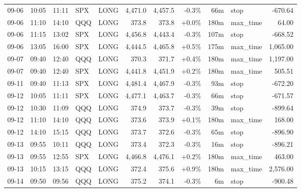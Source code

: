 \documentclass[11pt,a4paper,twoside]{article}
\begin{document}
\begin{center}
\begin{longtable}{>{\color{txtmain}}l l l l l r r r r >{\color{txtmain}}l r}
09-06 & 10:05 & 11:11 & SPX & LONG & 4,471.0 & 4,457.5 & \textcolor{lossred}{-0.3\%} & 66m & stop & \textcolor{lossred}{-670.64} \\
09-06 & 11:10 & 14:10 & QQQ & LONG & 373.8 & 373.8 & \textcolor{wingreen}{+0.0\%} & 180m & max\_time & \textcolor{wingreen}{64.00} \\
09-06 & 11:15 & 13:02 & SPX & LONG & 4,456.8 & 4,443.4 & \textcolor{lossred}{-0.3\%} & 107m & stop & \textcolor{lossred}{-668.52} \\
09-06 & 13:05 & 16:00 & SPX & LONG & 4,444.5 & 4,465.8 & \textcolor{wingreen}{+0.5\%} & 175m & max\_time & \textcolor{wingreen}{1,065.00} \\
09-07 & 09:40 & 12:40 & QQQ & LONG & 370.3 & 371.7 & \textcolor{wingreen}{+0.4\%} & 180m & max\_time & \textcolor{wingreen}{1,197.00} \\
09-07 & 09:40 & 12:40 & SPX & LONG & 4,441.8 & 4,451.9 & \textcolor{wingreen}{+0.2\%} & 180m & max\_time & \textcolor{wingreen}{505.51} \\
09-11 & 09:40 & 11:13 & SPX & LONG & 4,481.4 & 4,467.9 & \textcolor{lossred}{-0.3\%} & 93m & stop & \textcolor{lossred}{-672.20} \\
09-12 & 10:05 & 11:11 & SPX & LONG & 4,477.1 & 4,463.7 & \textcolor{lossred}{-0.3\%} & 66m & stop & \textcolor{lossred}{-671.57} \\
09-12 & 10:30 & 11:09 & QQQ & LONG & 374.9 & 373.7 & \textcolor{lossred}{-0.3\%} & 39m & stop & \textcolor{lossred}{-899.64} \\
09-12 & 11:10 & 14:10 & QQQ & LONG & 373.6 & 373.9 & \textcolor{wingreen}{+0.1\%} & 180m & max\_time & \textcolor{wingreen}{168.00} \\
09-12 & 14:10 & 15:15 & QQQ & LONG & 373.7 & 372.6 & \textcolor{lossred}{-0.3\%} & 65m & stop & \textcolor{lossred}{-896.90} \\
09-13 & 09:55 & 10:11 & QQQ & LONG & 373.4 & 372.3 & \textcolor{lossred}{-0.3\%} & 16m & stop & \textcolor{lossred}{-896.21} \\
09-13 & 09:55 & 12:55 & SPX & LONG & 4,466.8 & 4,476.1 & \textcolor{wingreen}{+0.2\%} & 180m & max\_time & \textcolor{wingreen}{463.00} \\
09-13 & 10:15 & 13:15 & QQQ & LONG & 372.4 & 375.6 & \textcolor{wingreen}{+0.9\%} & 180m & max\_time & \textcolor{wingreen}{2,576.00} \\
09-14 & 09:50 & 09:56 & QQQ & LONG & 375.2 & 374.1 & \textcolor{lossred}{-0.3\%} & 6m & stop & \textcolor{lossred}{-900.48} \\

\end{longtable}
\end{center}
\end{document}
